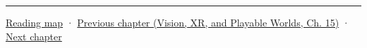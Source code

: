 \begin{center}\rule{0.5\linewidth}{0.5pt}\end{center}

\hyperref[volume-reading-map]{Reading map} · \href{../07-Vision-XR-and-Playable-Worlds/main.pdf\#nameddest=05-engine-i-ch012-transactions-recovery-and-safe-project-boundaries}{Previous chapter (Vision, XR, and Playable Worlds, Ch. 15)} · \hyperref[05-engine-i-ch014-application-clocks-and-stable-input-identity]{Next chapter}
